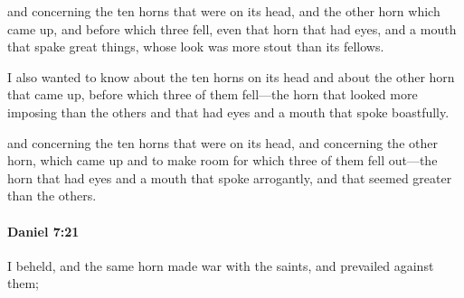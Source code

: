 			\begin{versebox}
					\item[BHS] 
					\item[LXX] 
					\item[ASV] and concerning the ten horns that were on its head, and the other horn which came up, and before which three fell, even that horn that had eyes, and a mouth that spake great things, whose look was more stout than its fellows.
					\item[NIV] I also wanted to know about the ten horns on its head and about the other horn that came up, before which three of them fell—the horn that looked more imposing than the others and that had eyes and a mouth that spoke boastfully.
					\item[NRSV] and concerning the ten horns that were on its head, and concerning the other horn, which came up and to make room for which three of them fell out—the horn that had eyes and a mouth that spoke arrogantly, and that seemed greater than the others.
			\end{versebox}

		\paragraph{Daniel 7:21} %
			\label{DANIEL-7-21}

			I beheld, and the same horn made war with the saints, and prevailed against them;

